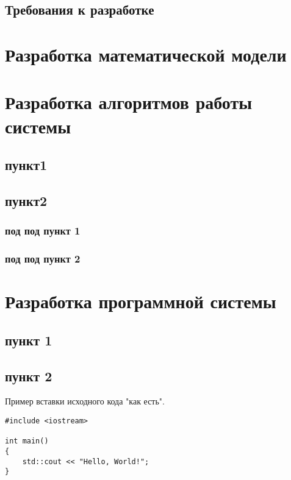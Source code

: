\subsection{Требования к разработке}
\lipsum[38]
\newpage



\section{Разработка математической модели}
\lipsum[40]
\newpage



\section{Разработка алгоритмов работы системы}
\subsection{пункт1}
\lipsum[9]

\subsection{пункт2}
\lipsum[10]

\subsubsection{под под пункт 1}
\lipsum[11]

\subsubsection{под под пункт 2}
\lipsum[12]
\newpage



\section{Разработка программной системы}
\subsection{пункт 1}
\lipsum[52]

\subsection{пункт 2}
Пример вставки исходного кода "как есть".
{\verbatimFont
\begin{verbatim}
#include <iostream>

int main()
{
    std::cout << "Hello, World!";
}
\end{verbatim}}

